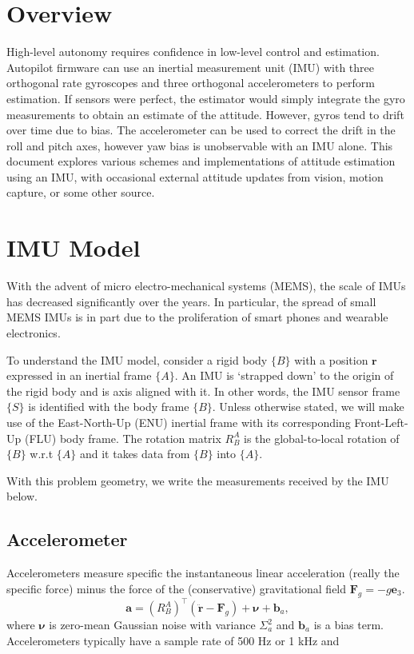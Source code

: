 \documentclass[a4paper]{article}
\begin{document}
\section*{Overview}
High-level autonomy requires confidence in low-level control and estimation.
Autopilot firmware can use an inertial measurement unit (IMU) with three orthogonal rate gyroscopes and three orthogonal accelerometers to perform estimation.
If sensors were perfect, the estimator would simply integrate the gyro measurements to obtain an estimate of the attitude.
However, gyros tend to drift over time due to bias.
The accelerometer can be used to correct the drift in the roll and pitch axes, however yaw bias is unobservable with an IMU alone.
This document explores various schemes and implementations of attitude estimation using an IMU, with occasional external attitude updates from vision, motion capture, or some other source.

\section*{IMU Model}
With the advent of micro electro-mechanical systems (MEMS), the scale of IMUs has decreased significantly over the years.
In particular, the spread of small MEMS IMUs is in part due to the proliferation of smart phones and wearable electronics.

To understand the IMU model, consider a rigid body $\{B\}$ with a position $\bm{r}$ expressed in an inertial frame $\{A\}$.
An IMU is `strapped down' to the origin of the rigid body and is axis aligned with it.
In other words, the IMU sensor frame $\{S\}$ is identified with the body frame $\{B\}$.
Unless otherwise stated, we will make use of the East-North-Up (ENU) inertial frame with its corresponding Front-Left-Up (FLU) body frame.
The rotation matrix $R^A_B$ is the global-to-local rotation of $\{B\}$ w.r.t $\{A\}$ and it takes data from $\{B\}$ into $\{A\}$.

With this problem geometry, we write the measurements received by the IMU below.

\subsection*{Accelerometer}
Accelerometers measure specific the instantaneous linear acceleration (really the specific force) minus the force of the (conservative) gravitational field $\bm{F}_g = -g\bm{e}_3$.
\begin{equation}
    \bm{a} = \left(R^A_B\right)^\top (\ddot{\bm r} - \bm{F}_g) + \bm{\nu} + \bm{b}_a,
\end{equation}
where $\bm{\nu}$ is zero-mean Gaussian noise with variance $\Sigma^2_a$ and $\bm{b}_a$ is a bias term.
Accelerometers typically have a sample rate of 500 Hz or 1 kHz and 
\end{document}
